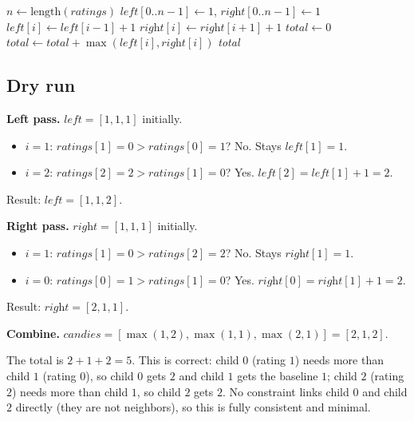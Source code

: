 \begin{algorithm}[H]
\caption{Candy Distribution}
\begin{algorithmic}[1]
  \State $n \gets \text{length}(\textit{ratings})$
  \State $\textit{left}[0..n-1] \gets 1$, $\textit{right}[0..n-1] \gets 1$
      \State $\textit{left}[i] \gets \textit{left}[i-1] + 1$
    \EndIf
  \EndFor
      \State $\textit{right}[i] \gets \textit{right}[i+1] + 1$
    \EndIf
  \EndFor
  \State $\textit{total} \gets 0$
    \State $\textit{total} \gets \textit{total} + \max(\textit{left}[i], \textit{right}[i])$
  \EndFor
  \State \Return \textit{total}
\EndProcedure
\end{algorithmic}
\end{algorithm}

\subsection*{Dry run}


\textbf{Left pass.} $\textit{left} = [1, 1, 1]$ initially.
\begin{itemize}
  \item $i=1$: $\textit{ratings}[1]=0 > \textit{ratings}[0]=1$? No. Stays
        $\textit{left}[1]=1$.
  \item $i=2$: $\textit{ratings}[2]=2 > \textit{ratings}[1]=0$? Yes.
        $\textit{left}[2] = \textit{left}[1]+1 = 2$.
\end{itemize}
Result: $\textit{left} = [1, 1, 2]$.

\textbf{Right pass.} $\textit{right} = [1, 1, 1]$ initially.
\begin{itemize}
  \item $i=1$: $\textit{ratings}[1]=0 > \textit{ratings}[2]=2$? No. Stays
        $\textit{right}[1]=1$.
  \item $i=0$: $\textit{ratings}[0]=1 > \textit{ratings}[1]=0$? Yes.
        $\textit{right}[0] = \textit{right}[1]+1 = 2$.
\end{itemize}
Result: $\textit{right} = [2, 1, 1]$.

\textbf{Combine.} $\textit{candies} = [\max(1,2), \max(1,1), \max(2,1)] =
[2, 1, 2]$.

The total is $2+1+2 = 5$. This is correct: child $0$ (rating $1$) needs more
than child $1$ (rating $0$), so child $0$ gets $2$ and child $1$ gets the
baseline $1$; child $2$ (rating $2$) needs more than child $1$, so child $2$
gets $2$. No constraint links child $0$ and child $2$ directly (they are not
neighbors), so this is fully consistent and minimal.

